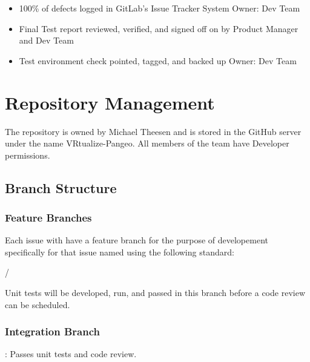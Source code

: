 \documentclass[letterpaper,10pt,english]{sphinxmanual}
\let\sphinxpxdimen\pdfpxdimen\else\newdimen\sphinxpxdimen
\begin{document}
\begin{itemize}
\begin{description}
\begin{itemize}
\item {} 
100\% of defects logged in GitLab’s  Issue Tracker System  Owner: Dev Team

\item {} 
Final Test report reviewed, verified, and signed off on by Product Manager and Dev Team

\item {} 
Test environment check pointed, tagged, and backed up     Owner: Dev Team

\end{itemize}

\end{description}

\end{itemize}


\chapter{Repository Management}
\label{\detokenize{test_plan/repository_management:repository-management}}\label{\detokenize{test_plan/repository_management::doc}}
The repository is owned by Michael Theesen and is stored in the GitHub server under the name VRtualize-Pangeo. All members of the team have Developer permissions.


\section{Branch Structure}
\label{\detokenize{test_plan/repository_management:branch-structure}}
\noindent\sphinxincludegraphics[width=600\sphinxpxdimen]{{branch_structure}.png}


\subsection{Feature Branches}
\label{\detokenize{test_plan/repository_management:feature-branches}}
Each issue with have a feature branch for the purpose of developement specifically for that issue named using the following standard:

/

Unit tests will be developed, run, and passed in this branch before a code review can be scheduled.


\subsection{Integration Branch}
\label{\detokenize{test_plan/repository_management:integration-branch}}
: Passes unit tests and code review.
\end{document}
